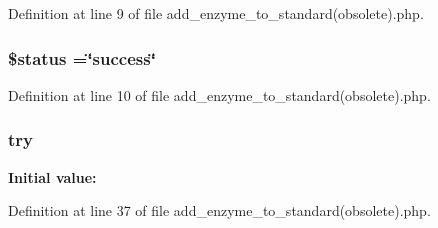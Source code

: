Definition at line 9 of file add\-\_\-enzyme\-\_\-to\-\_\-standard(obsolete).\-php.

\hypertarget{add__enzyme__to__standard_07obsolete_08_8php_a58391ea75f2d29d5d708d7050b641c33}{
\subsubsection[{\$status}]{\setlength{\rightskip}{0pt plus 5cm}\$status =\char`\"{}success\char`\"{}}}\label{add__enzyme__to__standard_07obsolete_08_8php_a58391ea75f2d29d5d708d7050b641c33}


Definition at line 10 of file add\-\_\-enzyme\-\_\-to\-\_\-standard(obsolete).\-php.

\hypertarget{add__enzyme__to__standard_07obsolete_08_8php_abe4cc9788f52e49485473dc699537388}{
\subsubsection[{try}]{\setlength{\rightskip}{0pt plus 5cm}try}}\label{add__enzyme__to__standard_07obsolete_08_8php_abe4cc9788f52e49485473dc699537388}
{\bfseries Initial value\-:}


Definition at line 37 of file add\-\_\-enzyme\-\_\-to\-\_\-standard(obsolete).\-php.

